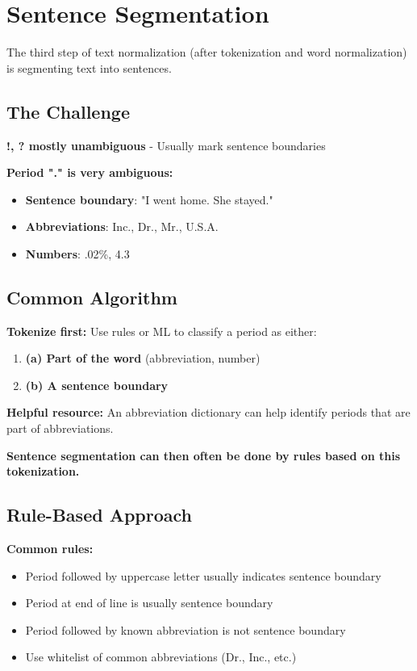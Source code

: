\documentclass[11pt,a4paper]{article}
\theoremstyle{definition}
\theoremstyle{plain}
\theoremstyle{remark}
\begin{document}
\section{Sentence Segmentation}

The third step of text normalization (after tokenization and word normalization) is segmenting text into sentences.

\subsection{The Challenge}

\textbf{!, ? mostly unambiguous} - Usually mark sentence boundaries

\textbf{Period "." is very ambiguous:}
\begin{itemize}
    \item \textbf{Sentence boundary}: "I went home. She stayed."
    \item \textbf{Abbreviations}: Inc., Dr., Mr., U.S.A.
    \item \textbf{Numbers}: .02\%, 4.3
\end{itemize}

\subsection{Common Algorithm}

\textbf{Tokenize first:} Use rules or ML to classify a period as either:
\begin{enumerate}
    \item \textbf{(a) Part of the word} (abbreviation, number)
    \item \textbf{(b) A sentence boundary}
\end{enumerate}

\textbf{Helpful resource:} An abbreviation dictionary can help identify periods that are part of abbreviations.

\textbf{Sentence segmentation can then often be done by rules based on this tokenization.}

\subsection{Rule-Based Approach}

\textbf{Common rules:}
\begin{itemize}
    \item Period followed by uppercase letter usually indicates sentence boundary
    \item Period at end of line is usually sentence boundary
    \item Period followed by known abbreviation is not sentence boundary
    \item Use whitelist of common abbreviations (Dr., Inc., etc.)
\end{itemize}
\end{document}
